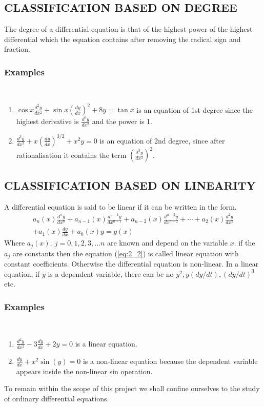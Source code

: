 \documentclass[11pt]{report}
\newcommand{\spn}[1]{\\[#1cm]}
\newcommand{\refn}[1]{(\ref{#1})}
\newcommand{\refx}[1]{\refn{eq:#1}}
\newcommand{\dsp}{\displaystyle}
\newcommand{\NI}{\noindent}
\newcommand{\examples}{\subsubsection*{Examples}{~}\spn{-1}}
\begin{document}
	\subsection{CLASSIFICATION BASED ON DEGREE}
	The degree of a differential equation is that of the highest power of the highest differential which the equation contains after removing the radical sign and fraction. \spn{-1.3}
	\examples
	\begin{enumerate}
		\item $\dsp \cos x \frac{d^2 y}{dx^2} + \sin x\left(\frac{dy}{dx}\right)^2 + 8y = \tan x $ is an equation of 1st degree since the highest derivative is $\dsp \frac{d^2y}{dx^2}$ and the power is 1.
		
		\item $\dsp \frac{d^3 y}{dx^3}+ x\left(\frac{dy}{dx}\right)^{3/2} + x^2 y = 0$ is an equation of 2nd degree, since after rationalisation it contains the term $\dsp\left(\frac{d^3y}{dx^3}\right)^2$.
	\end{enumerate}
	
	
	\subsection{CLASSIFICATION BASED ON LINEARITY}
	A differential equation is said to be linear if it can be written in the form.
	\begin{multline}
		a_n(x)\frac{d^ny}{dx^n} + a_{n-1}(x)\frac{d^{n-1}y}{dx^{n-1}} + a_{n-2}(x)\frac{d^{n-2}y}{dx^{n-2}} + \cdots + a_2(x)\frac{d^2y}{dx^2} \\+ a_1(x)\frac{dy}{dx} + a_0(x)y=g(x)\label{eq:2_2}
	\end{multline}
	Where $a_j(x),~ j = 0, 1, 2, 3,\ldots n$ are known and depend on the variable $x$. if the $a_j$ are constants then the equation \refx{2_2} is called linear equation with constant coefficients. Otherwise the differential equation is non-linear. In a linear equation, if $y$ is a dependent variable, there can be no $y^2, y(dy/dt), (dy/dt)^3$ etc.\spn{-1.25}
	\examples
	\begin{enumerate}
		\item $\dsp\frac{d^2 y}{dx^2} - 3\frac{dy}{dx} + 2y = 0$ is a linear equation.
		\item $\dsp \frac{dy}{dx} + x^2\sin(y)=0$ is a non-linear equation because the dependent variable appears inside the non-linear sin operation.
	\end{enumerate}
	
	\NI To remain within the scope of this project we shall confine ourselves to the study of ordinary differential equations.
	
\end{document}
